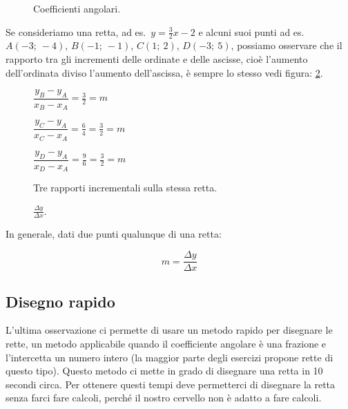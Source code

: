 \begin{inaccessibleblock}
 \begin{figure}[h]
 \centering
 \caption{Coefficienti angolari.}\label{fig:coeffang}
\end{figure}
\end{inaccessibleblock}

Se consideriamo una retta, ad es.~\(y=\frac{3}{2}x -2\) e alcuni suoi punti
ad es.~\(A(-3;~-4)\), \(B(-1;~-1)\), \(C(1;~2)\), \(D(-3;~5)\), possiamo osservare che 
il rapporto tra gli incrementi delle ordinate e delle ascisse, 
cioè l'aumento dell'ordinata diviso l'aumento dell'ascissa, è sempre lo 
stesso vedi figura: \ref{fig:rappincr}.

\begin{inaccessibleblock}
 \begin{figure}[h]
 \centering
 \begin{minipage}[]{.50\textwidth}
\(\dfrac{y_B - y_A}{x_B - x_A} = \frac{3}{2} = m\)

\(\dfrac{y_C - y_A}{x_C - x_A} = \frac{6}{4} = \frac{3}{2} = m\)

\(\dfrac{y_D - y_A}{x_D - x_A} = \frac{9}{6} = \frac{3}{2} = m\)
  \caption{Tre rapporti incrementali sulla stessa retta.}\label{calc:rappincr}
 \end{minipage}
 \begin{minipage}[]{.40\textwidth}
   \centering
  \caption{\(\frac{\Delta y}{\Delta x}\).}\label{fig:rappincr}
 \end{minipage}
\end{figure}
\end{inaccessibleblock}

In generale, dati due punti qualunque di una retta:

\[m = \frac{\Delta y}{\Delta x}\]

\subsection{Disegno rapido}

L'ultima osservazione ci permette di usare un metodo rapido per disegnare 
le rette, un metodo applicabile quando il coefficiente angolare è una 
frazione e l'intercetta un numero intero (la maggior parte degli esercizi 
propone rette di questo tipo). Questo metodo ci mette in grado di disegnare 
una retta in 10 secondi circa. Per ottenere questi tempi deve permetterci di 
disegnare la retta senza farci fare calcoli, perché il nostro cervello non è 
adatto a fare calcoli.

